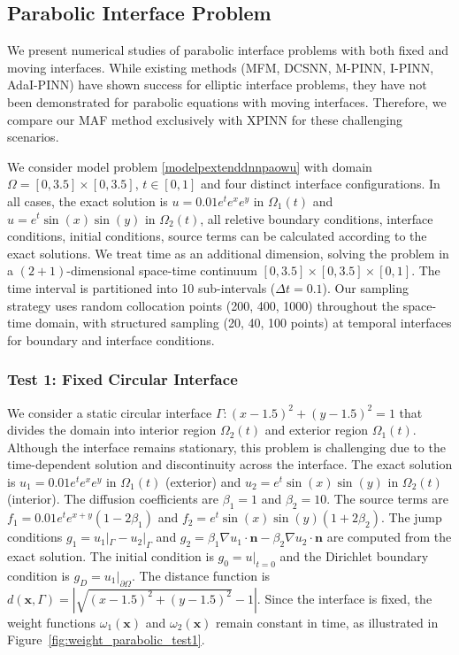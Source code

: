 \documentclass{article}
\begin{document}
\subsection{Parabolic Interface Problem}

We present numerical studies of parabolic interface problems with both fixed and moving interfaces. While existing methods (MFM, DCSNN, M-PINN, I-PINN, AdaI-PINN) have shown success for elliptic interface problems, they have not been demonstrated for parabolic equations with moving interfaces. Therefore, we compare our MAF method exclusively with XPINN for these challenging scenarios.

We consider model problem \eqref{modelpextenddnnpaowu} with domain $\Omega = [0,3.5] \times [0,3.5]$, $t \in [0,1]$ and four distinct interface configurations. In all cases, the exact solution is $u = 0.01 e^t e^x e^y$ in $\Omega_1(t)$ and $u = e^t \sin(x)\sin(y)$ in $\Omega_2(t)$, all reletive boundary conditions, interface conditions, initial conditions, source terms can be calculated according to the exact solutions. We treat time as an additional dimension, solving the problem in a $(2+1)$-dimensional space-time continuum $[0,3.5] \times [0,3.5] \times [0,1]$. The time interval is partitioned into 10 sub-intervals ($\Delta t = 0.1$). Our sampling strategy uses random collocation points (200, 400, 1000) throughout the space-time domain, with structured sampling (20, 40, 100 points) at temporal interfaces for boundary and interface conditions.

\subsubsection{Test 1: Fixed Circular Interface}

We consider a static circular interface $\Gamma: (x-1.5)^2 + (y-1.5)^2 = 1$ that divides the domain into interior region $\Omega_2(t)$ and exterior region $\Omega_1(t)$. Although the interface remains stationary, this problem is challenging due to the time-dependent solution and discontinuity across the interface. The exact solution is $u_1 = 0.01 e^t e^x e^y$ in $\Omega_1(t)$ (exterior) and $u_2 = e^t \sin(x)\sin(y)$ in $\Omega_2(t)$ (interior). The diffusion coefficients are $\beta_1 = 1$ and $\beta_2 = 10$. The source terms are $f_1 = 0.01 e^t e^{x+y}(1 - 2\beta_1)$ and $f_2 = e^t \sin(x)\sin(y)(1 + 2\beta_2)$. The jump conditions $g_1 = u_1|_\Gamma - u_2|_\Gamma$ and $g_2 = \beta_1 \nabla u_1 \cdot \boldsymbol{n} - \beta_2 \nabla u_2 \cdot \boldsymbol{n}$ are computed from the exact solution. The initial condition is $g_0 = u|_{t=0}$ and the Dirichlet boundary condition is $g_D = u_1|_{\partial\Omega}$. The distance function is $d(\mathbf{x}, \Gamma) = |\sqrt{(x-1.5)^2 + (y-1.5)^2} - 1|$. Since the interface is fixed, the weight functions $\omega_1(\mathbf{x})$ and $\omega_2(\mathbf{x})$ remain constant in time, as illustrated in Figure~\ref{fig:weight_parabolic_test1}.
\end{document}
